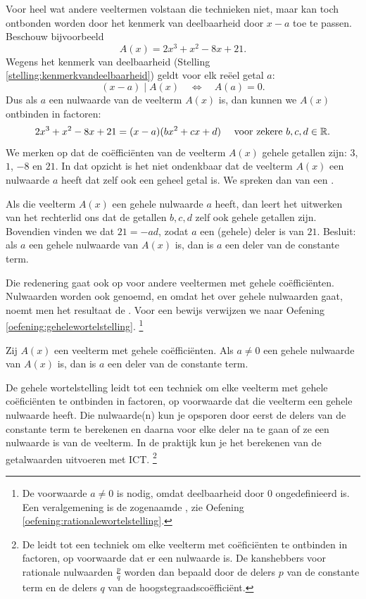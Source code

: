 \documentclass{ximera}
\begin{document}
Voor heel wat andere veeltermen volstaan die technieken niet, maar kan toch ontbonden worden door het kenmerk van deelbaarheid door $x-a$ toe te passen. Beschouw bijvoorbeeld
\[
A(x) = 2x^3 +x^2 - 8x + 21.
\]
Wegens het kenmerk van deelbaarheid (Stelling \ref{stelling:kenmerkvandeelbaarheid}) geldt voor elk re\"eel getal $a$: 
\[
(x-a) \mid A(x) \quad \Leftrightarrow \quad A(a) = 0. 
\]
Dus als $a$ een nulwaarde van de veelterm $A(x)$ is, dan kunnen we $A(x)$ ontbinden in factoren:
\[
2x^3 +x^2 - 8x + 21 = (x-a)(bx^2 + cx + d) %
\quad 
\text{ voor zekere } b,c,d \in \RR.
\]
We merken op dat de co\"effici\"enten van de veelterm $A(x)$ gehele getallen zijn: $3$, $1$, $-8$ en $21$. In dat opzicht is het niet ondenkbaar dat de veelterm $A(x)$ een nulwaarde $a$ heeft dat zelf ook een geheel getal is. We spreken dan van een .

Als die veelterm $A(x)$ een gehele nulwaarde $a$ heeft, dan leert het uitwerken van het rechterlid ons dat de getallen $b,c,d$ zelf ook gehele getallen zijn. Bovendien vinden we dat $21 = -ad$, zodat $a$ een (gehele) deler is van $21$. Besluit: als $a$ een gehele nulwaarde van $A(x)$ is, dan is $a$ een deler van de constante term. 

Die redenering gaat ook op voor andere veeltermen met gehele co\"effici\"enten. Nulwaarden worden ook  genoemd, en omdat het over gehele nulwaarden gaat, noemt men het resultaat de . Voor een bewijs verwijzen we naar Oefening \ref{oefening:gehelewortelstelling}.
\footnote{De voorwaarde $a \neq 0$ is nodig, omdat deelbaarheid door $0$ ongedefinieerd is.
Een veralgemening is de zogenaamde , zie Oefening \ref{oefening:rationalewortelstelling}.}

\begin{stelling} \label{stelling:gehelewortelstelling}
Zij $A(x)$ een veelterm met gehele co\"effici\"enten. Als $a \neq 0$ een gehele nulwaarde van $A(x)$ is, dan is $a$ een deler van de constante term. 
\end{stelling}





De gehele wortelstelling leidt tot een techniek om elke veelterm met gehele co\"efici\"enten te ontbinden in factoren, op voorwaarde dat die veelterm een gehele nulwaarde heeft. Die nulwaarde(n) kun je opsporen door eerst de delers van de constante term te berekenen en daarna voor elke deler na te gaan of ze een nulwaarde is van de veelterm. In de praktijk kun je het berekenen van de getalwaarden uitvoeren met ICT. \footnote{De  leidt tot een techniek om elke veelterm met  co\"efici\"enten 
te ontbinden in factoren, op voorwaarde dat er een  nulwaarde is. De kanshebbers voor rationale nulwaarden $\frac{p}{q}$ worden dan bepaald door de delers $p$ van de constante term en de delers $q$ van de hoogstegraadsco\"effici\"ent.}
\end{document}
